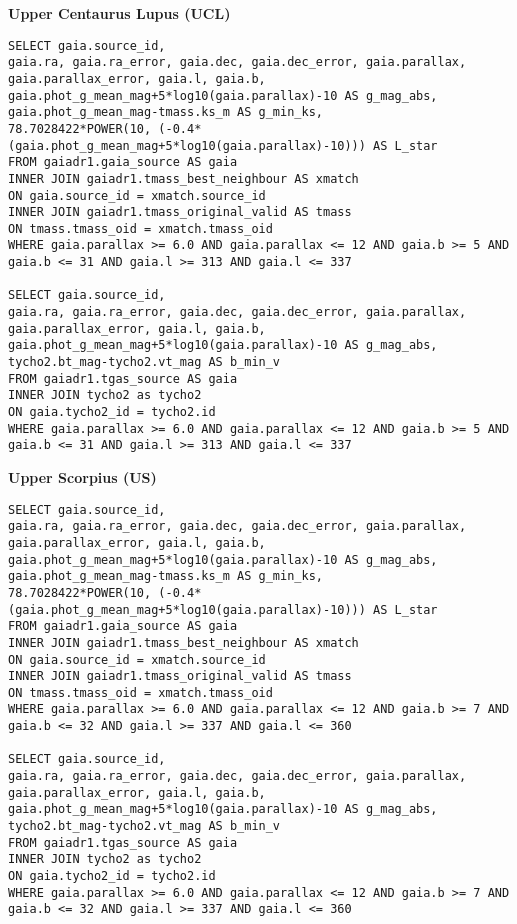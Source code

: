 \textbf{Upper Centaurus Lupus (UCL)}
\begin{lstlisting}[frame = single]
SELECT gaia.source_id, 
gaia.ra, gaia.ra_error, gaia.dec, gaia.dec_error, gaia.parallax, gaia.parallax_error, gaia.l, gaia.b,
gaia.phot_g_mean_mag+5*log10(gaia.parallax)-10 AS g_mag_abs,
gaia.phot_g_mean_mag-tmass.ks_m AS g_min_ks,
78.7028422*POWER(10, (-0.4*(gaia.phot_g_mean_mag+5*log10(gaia.parallax)-10))) AS L_star
FROM gaiadr1.gaia_source AS gaia
INNER JOIN gaiadr1.tmass_best_neighbour AS xmatch
ON gaia.source_id = xmatch.source_id
INNER JOIN gaiadr1.tmass_original_valid AS tmass
ON tmass.tmass_oid = xmatch.tmass_oid
WHERE gaia.parallax >= 6.0 AND gaia.parallax <= 12 AND gaia.b >= 5 AND gaia.b <= 31 AND gaia.l >= 313 AND gaia.l <= 337

SELECT gaia.source_id, 
gaia.ra, gaia.ra_error, gaia.dec, gaia.dec_error, gaia.parallax, gaia.parallax_error, gaia.l, gaia.b,
gaia.phot_g_mean_mag+5*log10(gaia.parallax)-10 AS g_mag_abs,
tycho2.bt_mag-tycho2.vt_mag AS b_min_v
FROM gaiadr1.tgas_source AS gaia
INNER JOIN tycho2 as tycho2
ON gaia.tycho2_id = tycho2.id
WHERE gaia.parallax >= 6.0 AND gaia.parallax <= 12 AND gaia.b >= 5 AND gaia.b <= 31 AND gaia.l >= 313 AND gaia.l <= 337
\end{lstlisting}\vspace{5mm}

\textbf{Upper Scorpius (US)}
\begin{lstlisting}[frame = single]
SELECT gaia.source_id, 
gaia.ra, gaia.ra_error, gaia.dec, gaia.dec_error, gaia.parallax, gaia.parallax_error, gaia.l, gaia.b,
gaia.phot_g_mean_mag+5*log10(gaia.parallax)-10 AS g_mag_abs,
gaia.phot_g_mean_mag-tmass.ks_m AS g_min_ks,
78.7028422*POWER(10, (-0.4*(gaia.phot_g_mean_mag+5*log10(gaia.parallax)-10))) AS L_star
FROM gaiadr1.gaia_source AS gaia
INNER JOIN gaiadr1.tmass_best_neighbour AS xmatch
ON gaia.source_id = xmatch.source_id
INNER JOIN gaiadr1.tmass_original_valid AS tmass
ON tmass.tmass_oid = xmatch.tmass_oid
WHERE gaia.parallax >= 6.0 AND gaia.parallax <= 12 AND gaia.b >= 7 AND gaia.b <= 32 AND gaia.l >= 337 AND gaia.l <= 360

SELECT gaia.source_id, 
gaia.ra, gaia.ra_error, gaia.dec, gaia.dec_error, gaia.parallax, gaia.parallax_error, gaia.l, gaia.b,
gaia.phot_g_mean_mag+5*log10(gaia.parallax)-10 AS g_mag_abs,
tycho2.bt_mag-tycho2.vt_mag AS b_min_v
FROM gaiadr1.tgas_source AS gaia
INNER JOIN tycho2 as tycho2
ON gaia.tycho2_id = tycho2.id
WHERE gaia.parallax >= 6.0 AND gaia.parallax <= 12 AND gaia.b >= 7 AND gaia.b <= 32 AND gaia.l >= 337 AND gaia.l <= 360
\end{lstlisting}
